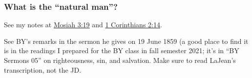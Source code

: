 	
		
	\subsubsection{What is the ``natural man''?}
		\label{NATURAL-man}
		
		See my notes at \hyperref[MOSIAH-3-19]{Mosiah 3:19} and \hyperref[1CORINTHIANS-2-14]{1 Corinthians 2:14}.
		
		See BY's remarks in the sermon he gives on 19 June 1859 (a good place to find it is in the readings I prepared for the BY class in fall semester 2021; it's in ``BY Sermons 05'' on righteousness, sin, and salvation. Make sure to read LaJean's transcription, not the JD.